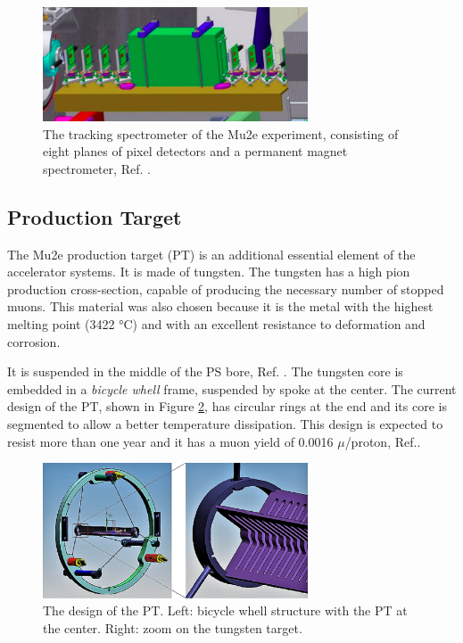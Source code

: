 \begin{figure}[!h]
\centering
\includegraphics[width =0.7\textwidth]{figures/png/Screenshot_20240306_184720.png}
\caption[The Extintion Monitor.]{The tracking spectrometer of the Mu2e experiment, consisting of eight planes of pixel detectors and a permanent magnet spectrometer, Ref. \cite{Prebys:IPAC2015-THPF121}.}
\label{fig:extintionmonitor}
\end{figure}
\subsection{Production Target}
The Mu2e production target (PT) is an additional essential element of the 
accelerator systems. It is made of tungsten. 
The tungsten has a high pion production cross-section, 
capable of producing the necessary number of stopped muons. 
This material was also chosen because it is the metal with the highest
melting point (3422 °C) and with an excellent resistance to deformation and corrosion.

It is suspended in the middle of the PS bore, Ref. \cite{bartoszek2015mu2e}.
The tungsten core is embedded in a \textit{bicycle whell} frame, 
suspended by spoke at the center. The current design of the PT, shown in Figure \ref{fig:PT}, 
has circular rings at the end and its core is segmented to allow a better temperature 
dissipation. This design is expected to resist more than one year and it has a muon yield
of 0.0016 $\mu$/proton, Ref.\cite{PT}.
\begin{figure}[!h]
    \centering
    \includegraphics[width =0.7\textwidth]{figures/png/Screenshot_20240706_114229.png}
    \caption[The Production Target design.]{The design of the PT. Left: bicycle whell structure with the PT at the
    center. Right: zoom on the tungsten target.}
    \label{fig:PT}
\end{figure}

